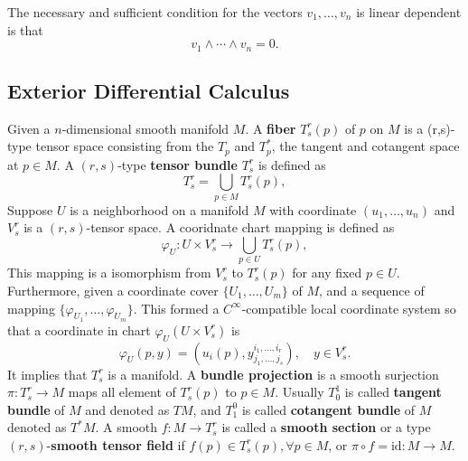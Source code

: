 \begin{theorem}
The necessary and sufficient condition for the vectors $v_1,\dots,v_n$ is linear dependent is that
\begin{equation}
v_1\wedge\cdots\wedge v_n=0.
\end{equation}
\end{theorem}

\subsection{Exterior Differential Calculus}
\begin{definition}
Given a $n$-dimensional smooth manifold $M$. A \textbf{fiber} $T^r_s(p)$ of $p$ on $M$ is a (r,s)-type tensor space consisting from the $T_p$ and $T^*_p$, the tangent and cotangent space at $p\in M$. A $(r,s)$-type \textbf{tensor bundle} $T^r_s$ is defined as
\begin{equation}
T^r_s=\bigcup_{p\in M}T^r_s(p),
\end{equation}
Suppose $U$ is a neighborhood on a manifold $M$ with coordinate $(u_1,\dots,u_n)$ and $V^r_s$ is a $(r,s)$-tensor space. A cooridnate chart mapping is defined as
\begin{equation}
\varphi_U:U\times V^r_s\to \bigcup_{p\in U}T^r_s(p),
\end{equation}
This mapping is a isomorphism from $V^r_s$ to $T^r_s(p)$ for any fixed $p\in U$. Furthermore, given a coordinate cover $\{U_1,\dots,U_m\}$ of $M$, and a sequence of mapping $\{\varphi_{U_1},\dots,\varphi_{U_m}\}$. This formed a $C^\infty$-compatible local coordinate system so that a coordinate in chart $\varphi_U(U\times V^r_s)$ is
\begin{equation}
\varphi_U(p,y)=\left(u_i(p),y^{i_1,\dots,i_r}_{j_1,\dots,j_s}\right),\quad y\in V^r_s.
\end{equation}
It implies that $T^r_s$ is a manifold. A \textbf{bundle projection} is a smooth surjection $\pi:T^r_s\to M$ maps all element of $T^r_s(p)$ to $p\in M$. Usually $T^1_0$ is called \textbf{tangent bundle} of $M$ and denoted as $TM$, and $T_1^0$ is called \textbf{cotangent bundle} of $M$ denoted as $T^*M$.
A smooth $f:M\to T^r_s$ is called a \textbf{smooth section} or a type $(r,s)$-\textbf{smooth tensor field} if $f(p)\in T^r_s(p),\forall p\in M$, or $\pi\circ f=\text{id}:M\to M$.
\end{definition}


